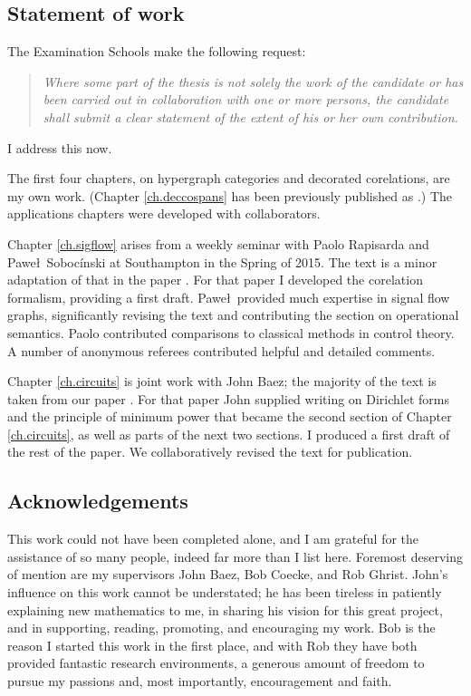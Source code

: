 \subsection*{Statement of work}

The Examination Schools make the following request:
\begin{quote}
\emph{Where some part of the thesis is not solely the work of the candidate or
has been carried out in collaboration with one or more persons, the candidate
shall submit a clear statement of the extent of his or her own contribution.}
\end{quote}
I address this now. 

The first four chapters, on hypergraph categories and decorated corelations, are
my own work. (Chapter \ref{ch.deccospans} has been previously published as
\cite{Fon15}.) The applications chapters were developed with collaborators. 

Chapter \ref{ch.sigflow} arises from a weekly seminar with Paolo Rapisarda and
Pawe\l\ Soboc\'inski at Southampton in the Spring of 2015. The text is a minor
adaptation of that in the paper \cite{FRS16}. For that paper I developed the
corelation formalism, providing a first draft. Pawe\l\ provided much expertise
in signal flow graphs, significantly revising the text and contributing the
section on operational semantics. Paolo contributed comparisons to classical
methods in control theory.  A number of anonymous referees contributed helpful
and detailed comments.

Chapter \ref{ch.circuits} is joint work with John Baez; the majority of the text
is taken from our paper \cite{BF}. For that paper John supplied writing on
Dirichlet forms and the principle of minimum power that became the second
section of Chapter \ref{ch.circuits}, as well as parts of the next two sections.
I produced a first draft of the rest of the paper. We collaboratively revised
the text for publication.

\subsection*{Acknowledgements}
This work could not have been completed alone, and I am grateful for the
assistance of so many people, indeed far more than I list here. Foremost
deserving of mention are my supervisors John Baez, Bob Coecke, and Rob Ghrist.
John's influence on this work cannot be understated; he has been tireless in
patiently explaining new mathematics to me, in sharing his vision for this great
project, and in supporting, reading, promoting, and encouraging my work. Bob is
the reason I started this work in the first place, and with Rob they have both
provided fantastic research environments, a generous amount of freedom to pursue
my passions and, most importantly, encouragement and faith.

